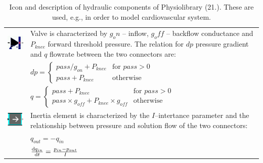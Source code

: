 \begin{table}[!ht]
\begin{tabular}{m{1.0cm} m{10.2cm}}
 \hline
\includegraphics[scale=0.5]{valve.png} & Valve is characterized by $g_on$ -- inflow, $g_off$ -- backflow conductance and $P_{knee}$ forward threshold pressure. The relation for $dp$ pressure gradient and $q$ flowrate between the two connectors are:\\
 & $dp = \left\{ \begin{array}{lr} pass/g_{on} +P_{knee} & \text{for } pass >0 \\
   pass + P_{knee} & \text{otherwise} \end{array} \right. $ \\
 & $q = \left\{ \begin{array}{lr} pass + P_{knee} & \text{for } pass > 0 \\
     pass \times g_{off} +P_{knee} \times g_{off} & \text{otherwise } \end{array} \right. $ \\  
\hline
\includegraphics[scale=0.2]{inertia.png} & Inertia element is characterized by the $I$--intertance parameter and the relationship between pressure and solution flow of the two connectors:\\
 & $ q_{out}=-q_{in} $ \\
 & $ \frac{{\rm d}q_{in}}{{\rm d}t} = \frac{p_{in}-p_{out}}{I} $ \\
\hline
 \end{tabular}
 \caption{Icon and description of hydraulic components of Physiolibrary (21.). These are used, e.g., in order to model cardiovascular system.}
 \label{table:physiolibrary}
\end{table}

